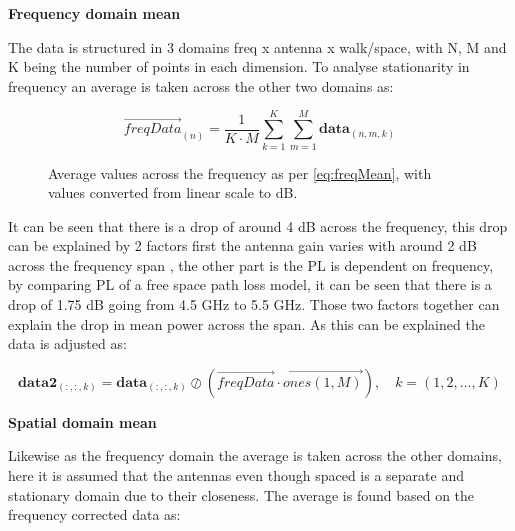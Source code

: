 \textbf{Frequency domain mean}

The data is structured in 3 domains freq x antenna x walk/space, with N, M and K being the number of points in each dimension. To analyse stationarity in frequency an average is taken across the other two domains as:

\begin{equation}\label{eq:freqMean}
\overrightarrow{freqData}_{(n)} = \frac{1}{K\cdot M}\sum_{k = 1}^{K}\sum_{m = 1}^{M} \textbf{data}_{(n,m,k)}
\end{equation}
\begin{where}
\end{where}


\begin{figure}[H]
\centering

\caption{Average values across the frequency as per \autoref{eq:freqMean}, with values converted from linear scale to dB.}
\label{fig:meanFading}
\end{figure}

It can be seen that there is a drop of around 4 dB across the frequency, this drop can be explained by 2 factors first the antenna gain varies with around 2 dB across the frequency span , the other part is the \gls{PL} is dependent on frequency, by comparing PL of a free space path loss model, it can be seen that there is a drop of 1.75 dB going from 4.5 GHz to 5.5 GHz. Those two factors together can explain the drop in mean power across the span. As this can be explained the data is adjusted as:

\begin{equation}
\textbf{data2}_{(:,:,k)} =  \textbf{data}_{(:,:,k)} \oslash \left(\overrightarrow{freqData}\cdot \overrightarrow{ones(1,M)}\right), \quad k = (1,2,...,K)
\end{equation}
\begin{where}
\end{where}

\textbf{Spatial domain mean}

Likewise as the frequency domain the average is taken across the other domains, here it is assumed that the antennas even though spaced is a separate and stationary domain due to their closeness. The average is found based on the frequency corrected data as:

